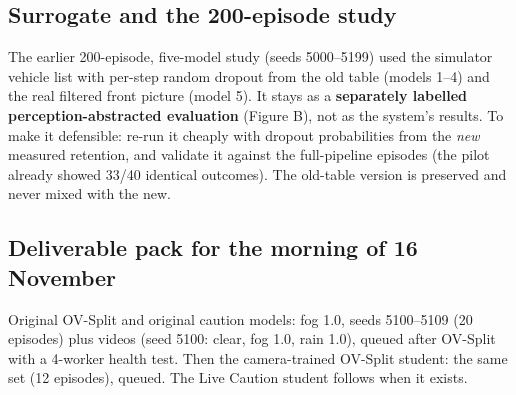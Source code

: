\documentclass[11pt,a4paper]{article}
\begin{document}
\subsection{Surrogate and the 200-episode study}\label{sec:surrogate}
The earlier 200-episode, five-model study (seeds 5000--5199) used the simulator vehicle list with per-step random dropout from the old table (models 1--4) and the real filtered front picture (model 5). It stays as a \textbf{separately labelled perception-abstracted evaluation} (Figure B), not as the system's results. To make it defensible: re-run it cheaply with dropout probabilities from the \emph{new} measured retention, and validate it against the full-pipeline episodes (the pilot already showed 33/40 identical outcomes). The old-table version is preserved and never mixed with the new.
\subsection{Deliverable pack for the morning of 16 November}
Original OV-Split and original caution models: fog 1.0, seeds 5100--5109 (20 episodes) plus videos (seed 5100: clear, fog 1.0, rain 1.0), queued after OV-Split with a 4-worker health test. Then the camera-trained OV-Split student: the same set (12 episodes), queued. The Live Caution student follows when it exists.
\end{document}
